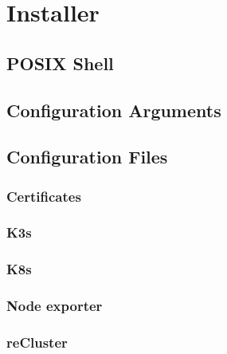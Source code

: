 \section{Installer}
\label{sec:implementation_installer}

\subsection{POSIX Shell}
\label{subsec:implementation_installer_posix_shell}

\subsection{Configuration Arguments}
\label{subsec:implementation_installer_configuration_arguments}

\subsection{Configuration Files}
\label{subsec:implementation_installer_configuration_files}

\subsubsection{Certificates}
\label{subsubsec:implementation_installer_configuration_files_certificates}

\subsubsection{K3s}
\label{subsubsec:implementation_installer_configuration_files_k3s}

\subsubsection{K8s}
\label{subsubsec:implementation_installer_configuration_filesn_k8s}

\subsubsection{Node exporter}
\label{subsubsec:implementation_installer_configuration_files_node_exporter}

\subsubsection{reCluster}
\label{subsubsec:implementation_installer_configuration_files_recluster}

